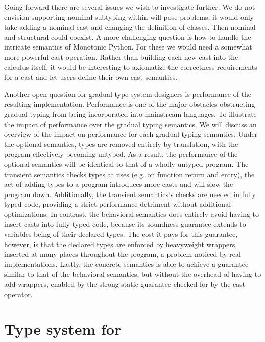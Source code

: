 \documentclass[runnningheads]{tex/llncs}
\begin{document}
Going forward there are several issues we wish to investigate further.  We
do not envision supporting nominal subtyping within \kafka will pose
problems, it would only take adding a nominal cast and changing the
definition of classes. Then nominal and structural could coexist. A more
challenging question is how to handle the intricate semantics of Monotonic
Python. For these we would need a somewhat more powerful cast operation.
Rather than building each new cast into the calculus itself, it would be
interesting to axiomatize the correctness requirements for a cast and let
users define their own cast semantics.

Another open question for gradual type system designers is performance of
the resulting implementation.  Performance is one of the major obstacles
obstructing gradual typing from being incorporated into mainstream
languages. To illustrate the impact of performance over the gradual typing
semantics. We will discuss an overview of the impact on performance for each
gradual typing semantics.  Under the optional semantics, types are removed
entirely by translation, with the program effectively becoming untyped. As a
result, the performance of the optional semantics will be identical to that
of a wholly untyped program.  The transient semantics checks types at uses
(e.g. on function return and entry), the act of adding types to a program
introduces more casts and will slow the program down. Additionally, the
transient semantics's checks are needed in fully typed code, providing a
strict performance detriment without additional optimizations.  In contrast,
the behavioral semantics does entirely avoid having to insert casts into
fully-typed code, because its soundness guarantee extends to variables being
of their declared types. The cost it pays for this guarantee, however, is
that the declared types are enforced by heavyweight wrappers, inserted at
many places throughout the program, a problem noticed by real
implementations.  Lastly, the concrete semantics is able to achieve a
guarantee similar to that of the behavioral semantics, but without the
overhead of having to add wrappers, enabled by the strong static guarantee
checked for by the cast operator.




\newpage
\appendix
\section{Type system for \kafka}%
\label{appendix:kafka}
\end{document}
